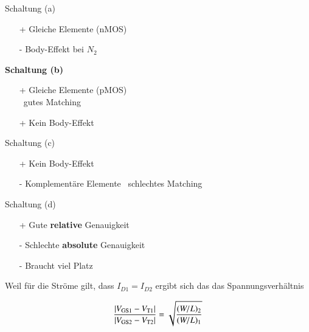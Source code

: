 \begin{minipage}[t]{0.36\columnwidth}
    Schaltung (a)
    \begin{itemize}
        \item[+] Gleiche Elemente (nMOS)
        \item[-] Body-Effekt bei $N_2$
    \end{itemize}
   
    \smallskip

    \textbf{Schaltung (b)}
    \begin{itemize}
        \item[+] Gleiche Elemente (pMOS) \\
            \textrightarrow\ gutes Matching
        \item[+] Kein Body-Effekt
    \end{itemize}
\end{minipage}
\hfill
\begin{minipage}[t]{0.6\columnwidth}
    Schaltung (c)
    \begin{itemize}
        \item[+] Kein Body-Effekt
        \item[-] Komplementäre Elemente
            \textrightarrow\ schlechtes Matching
    \end{itemize}
   
    \smallskip

    Schaltung (d)
    \begin{itemize}
        \item[+] Gute \textbf{relative} Genauigkeit
        \item[-] Schlechte \textbf{absolute} Genauigkeit
        \item[-] Braucht viel Platz 
    \end{itemize}
\end{minipage}

\smallskip

\begin{minipage}[c]{0.55\columnwidth}
    Weil für die Ströme gilt, dass $I_{D1} = I_{D2}$ ergibt sich das das Spannungsverhältnis
\end{minipage}
\hfill
\begin{minipage}[c]{0.4\columnwidth}
    \[
        \frac{\left|V_{\rm GS1} - V_{\rm T1}\right|}{\left|V_{\rm GS2} - V_{\rm T2}\right|} = \sqrt{\frac{(W / L)_2}{(W / L)_1}}
    \]
\end{minipage}